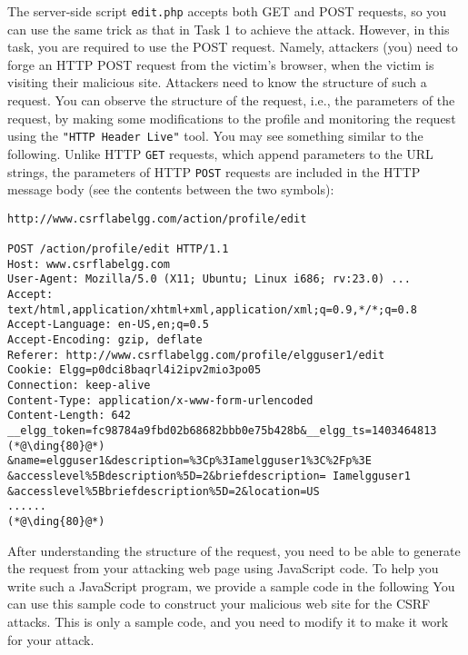 The server-side script {\tt edit.php} accepts both GET and POST requests,
so you can use the same trick as that in Task 1 to achieve the attack.
However, in this task, you are required to use the POST request. 
Namely, attackers (you) need to forge an HTTP POST request from the victim's
browser, when the victim is visiting their malicious site. 
Attackers need to know the structure of such a request.
You can observe the
structure of the request, i.e.,  the parameters of the request, by making
some modifications to the profile and monitoring the request using
the \texttt{"HTTP Header Live"} tool. 
You may see something similar to
the following. Unlike HTTP {\tt GET} requests, which append 
parameters to the URL strings, the parameters of HTTP {\tt POST} requests are 
included in the HTTP message body (see the contents between the two 
 symbols): 


\begin{lstlisting}
http://www.csrflabelgg.com/action/profile/edit

POST /action/profile/edit HTTP/1.1
Host: www.csrflabelgg.com
User-Agent: Mozilla/5.0 (X11; Ubuntu; Linux i686; rv:23.0) ...
Accept: text/html,application/xhtml+xml,application/xml;q=0.9,*/*;q=0.8
Accept-Language: en-US,en;q=0.5
Accept-Encoding: gzip, deflate
Referer: http://www.csrflabelgg.com/profile/elgguser1/edit
Cookie: Elgg=p0dci8baqrl4i2ipv2mio3po05
Connection: keep-alive
Content-Type: application/x-www-form-urlencoded
Content-Length: 642
__elgg_token=fc98784a9fbd02b68682bbb0e75b428b&__elgg_ts=1403464813  (*@\ding{80}@*) 
&name=elgguser1&description=%3Cp%3Iamelgguser1%3C%2Fp%3E
&accesslevel%5Bdescription%5D=2&briefdescription= Iamelgguser1
&accesslevel%5Bbriefdescription%5D=2&location=US
......                                                              (*@\ding{80}@*)
\end{lstlisting}


After understanding the structure of the request, you need to 
be able to generate the request from your attacking web page
using JavaScript code. 
To help you write such a JavaScript program,  we provide a 
sample code in the following You can use this sample code to construct your malicious web site
for the CSRF attacks. This is only a sample code, and you need to modify it to 
make it work for your attack.


